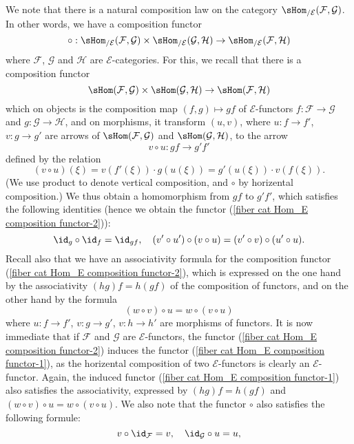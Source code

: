 We note that there is a natural composition law on the category $\sHom_{/\mathcal{E}}(\mathcal{F},\mathcal{G})$. In other words, we have a composition functor
\begin{equation}\label{fiber cat Hom_E composition functor-1}
\circ:\sHom_{/\mathcal{E}}(\mathcal{F},\mathcal{G})\times \sHom_{/\mathcal{E}}(\mathcal{G},\mathcal{H})\to \sHom_{/\mathcal{E}}(\mathcal{F},\mathcal{H})
\end{equation}
where $\mathcal{F}$, $\mathcal{G}$ and $\mathcal{H}$ are $\mathcal{E}$-categories. For this, we recall that there is a composition functor
\begin{equation}\label{fiber cat Hom_E composition functor-2}
\sHom(\mathcal{F},\mathcal{G})\times\sHom(\mathcal{G},\mathcal{H})\to \sHom(\mathcal{F},\mathcal{H})
\end{equation}
which on objects is the composition map $(f,g)\mapsto gf$ of $\mathcal{E}$-functors $f:\mathcal{F}\to \mathcal{G}$ and $g:\mathcal{G}\to \mathcal{H}$, and on morphisms, it transform $(u,v)$, where $u:f\to f'$, $v:g\to g'$ are arrows of $\sHom(\mathcal{F},\mathcal{G})$ and $\sHom(\mathcal{G},\mathcal{H})$, to the arrow
\[v\circ u:gf\to g'f'\]
defined by the relation
\[(v\circ u)(\xi)=v(f'(\xi))\cdot g(u(\xi))=g'(u(\xi))\cdot v(f(\xi)).\]
(We use product to denote vertical composition, and $\circ$ by horizental composition.) We thus obtain a homomorphism from $gf$ to $g'f'$, which satisfies the following identities (hence we obtain the functor (\ref{fiber cat Hom_E composition functor-2})):
\[\id_g\circ\id_f=\id_{gf},\quad (v'\circ u')\circ(v\circ u)=(v'\circ v)\circ(u'\circ u).\]
Recall also that we have an associativity formula for the composition functor (\ref{fiber cat Hom_E composition functor-2}), which is expressed on the one hand by the associativity $(hg)f=h(gf)$ of the composition of functors, and on the other hand by the formula
\[(w\circ v)\circ u=w\circ(v\circ u)\]
where $u:f\to f'$, $v:g\to g'$, $v:h\to h'$ are morphisms of functors. It is now immediate that if $\mathcal{F}$ and $\mathcal{G}$ are $\mathcal{E}$-functors, the functor (\ref{fiber cat Hom_E composition functor-2}) induces the functor (\ref{fiber cat Hom_E composition functor-1}), as the horizental composition of two $\mathcal{E}$-functors is clearly an $\mathcal{E}$-functor. Again, the induced functor (\ref{fiber cat Hom_E composition functor-1}) also satisfies the associativity, expressed by $(hg)f=h(gf)$ and $(w\circ v)\circ u=w\circ(v\circ u)$. We also note that the functor $\circ$ also satisfies the following formule:
\[v\circ\id_\mathcal{F}=v,\quad \id_\mathcal{G}\circ u=u,\]

